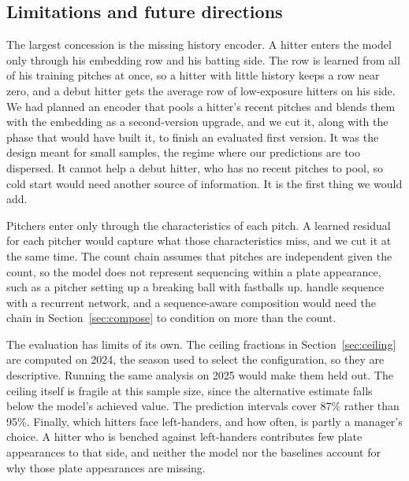 \documentclass[11pt,letterpaper]{article}
\begin{document}
\subsection{Limitations and future directions}
\label{sec:limits}

The largest concession is the missing history encoder. A hitter enters the model only through his embedding row and his batting side. The row is learned from all of his training pitches at once, so a hitter with little history keeps a row near zero, and a debut hitter gets the average row of low-exposure hitters on his side. We had planned an encoder that pools a hitter's recent pitches and blends them with the embedding as a second-version upgrade, and we cut it, along with the phase that would have built it, to finish an evaluated first version. It was the design meant for small samples, the regime where our predictions are too dispersed. It cannot help a debut hitter, who has no recent pitches to pool, so cold start would need another source of information. It is the first thing we would add.

Pitchers enter only through the characteristics of each pitch. A learned residual for each pitcher would capture what those characteristics miss, and we cut it at the same time. The count chain assumes that pitches are independent given the count, so the model does not represent sequencing within a plate appearance, such as a pitcher setting up a breaking ball with fastballs up. \citet{melville2023} handle sequence with a recurrent network, and a sequence-aware composition would need the chain in Section~\ref{sec:compose} to condition on more than the count.

The evaluation has limits of its own. The ceiling fractions in Section~\ref{sec:ceiling} are computed on 2024, the season used to select the configuration, so they are descriptive. Running the same analysis on 2025 would make them held out. The ceiling itself is fragile at this sample size, since the alternative estimate falls below the model's achieved value. The prediction intervals cover 87\% rather than 95\%. Finally, which hitters face left-handers, and how often, is partly a manager's choice. A hitter who is benched against left-handers contributes few plate appearances to that side, and neither the model nor the baselines account for why those plate appearances are missing.
\end{document}
